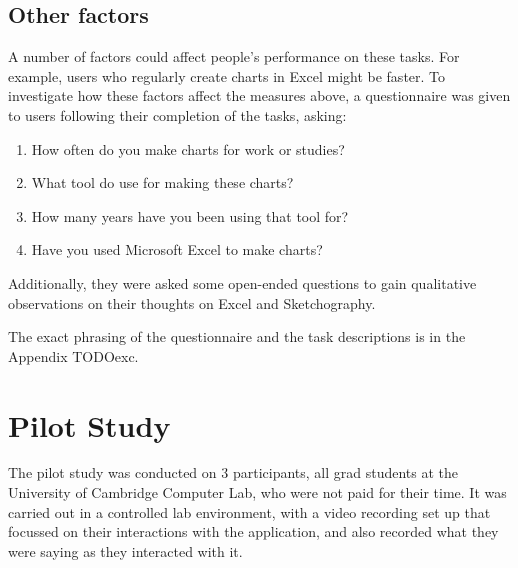 \subsection*{Other factors}
A number of factors could affect people's performance on these tasks. For example, users who regularly create charts in Excel might be faster. To investigate how these factors affect the measures above, a questionnaire was given to users following their completion of the tasks, asking:

\begin{enumerate}
\item How often do you make charts for work or studies?
\item What tool do use for making these charts?
\item How many years have you been using that tool for?
\item Have you used Microsoft Excel to make charts?
\end{enumerate}

Additionally, they were asked some open-ended questions to gain qualitative observations on their thoughts on Excel and Sketchography.

The exact phrasing of the questionnaire and the task descriptions is in the Appendix TODOexc.


\section{Pilot Study}
The pilot study was conducted on 3 participants, all grad students at the University of Cambridge Computer Lab, who were not paid for their time. It was carried out in a controlled lab environment, with a video recording set up that focussed on their interactions with the application, and also recorded what they were saying as they interacted with it.

